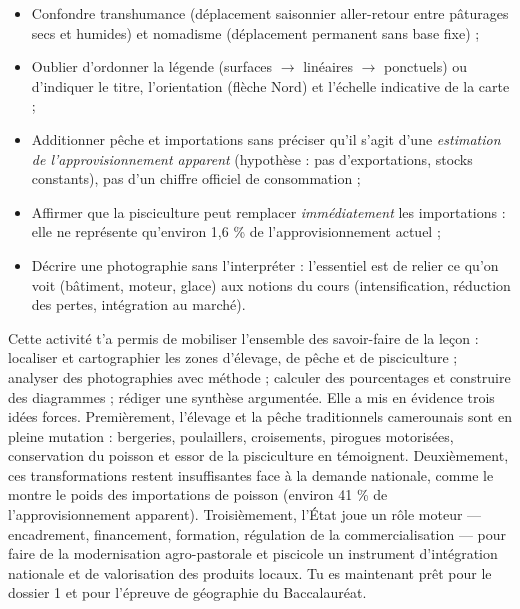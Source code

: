 \documentclass[11pt]{article}
\newcommand{\cle}[1]{{\popxbold\color{popdark}#1}}
\newcounter{popsec}
\newcounter{popsub}
\newcommand{\courssub}[1]{%
  \stepcounter{popsub}%
  \par\vspace{9pt}\noindent{\popxbold\fontsize{11.5}{13}\selectfont\color{popink}{\color{poporange}\thepopsec.\thepopsub}\hspace{6pt}#1}\par\nopagebreak\vspace{4pt}
}
\begin{document}
\begin{attention}
\begin{itemize}
\item Confondre \cle{transhumance} (déplacement saisonnier aller-retour entre pâturages secs et humides) et \cle{nomadisme} (déplacement permanent sans base fixe) ;
\item Oublier d'ordonner la légende (surfaces $\to$ linéaires $\to$ ponctuels) ou d'indiquer le titre, l'orientation (flèche Nord) et l'échelle indicative de la carte ;
\item Additionner pêche et importations sans préciser qu'il s'agit d'une \emph{estimation de l'approvisionnement apparent} (hypothèse : pas d'exportations, stocks constants), pas d'un chiffre officiel de consommation ;
\item Affirmer que la pisciculture peut remplacer \emph{immédiatement} les importations : elle ne représente qu'environ 1,6 \% de l'approvisionnement actuel ;
\item Décrire une photographie sans l'interpréter : l'essentiel est de relier ce qu'on voit (bâtiment, moteur, glace) aux notions du cours (intensification, réduction des pertes, intégration au marché).
\end{itemize}
\end{attention}

\courssub{Bilan de l'activité}

Cette activité t'a permis de mobiliser l'ensemble des savoir-faire de la leçon : localiser et cartographier les zones d'élevage, de pêche et de pisciculture ; analyser des photographies avec méthode ; calculer des pourcentages et construire des diagrammes ; rédiger une synthèse argumentée. Elle a mis en évidence trois idées forces. Premièrement, l'élevage et la pêche traditionnels camerounais sont en pleine mutation : bergeries, poulaillers, croisements, pirogues motorisées, conservation du poisson et essor de la pisciculture en témoignent. Deuxièmement, ces transformations restent insuffisantes face à la demande nationale, comme le montre le poids des importations de poisson (environ 41 \% de l'approvisionnement apparent). Troisièmement, l'État joue un rôle moteur — encadrement, financement, formation, régulation de la commercialisation — pour faire de la modernisation agro-pastorale et piscicole un instrument d'\cle{intégration nationale} et de valorisation des produits locaux. Tu es maintenant prêt pour le dossier 1 et pour l'épreuve de géographie du Baccalauréat.
\end{document}
